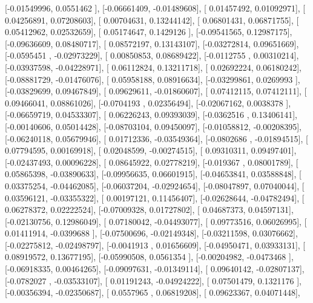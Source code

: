 \documentclass{article}
\begin{document}
       [-0.01549996,  0.0551462 ],
       [-0.06661409, -0.01489608],
       [ 0.01457492,  0.01092971],
       [ 0.04256891,  0.07208603],
       [ 0.00704631,  0.13244142],
       [ 0.06801431,  0.06871755],
       [ 0.05412962,  0.02532659],
       [ 0.05174647,  0.1429126 ],
       [-0.09541565,  0.12987175],
       [-0.09636609,  0.08480717],
       [ 0.08572197,  0.13143107],
       [-0.03272814,  0.09651669],
       [-0.0595451 , -0.02973229],
       [ 0.00850853,  0.08689422],
       [-0.0112755 ,  0.00310214],
       [-0.03937598, -0.04228971],
       [ 0.06112824,  0.13211718],
       [ 0.02692224,  0.06180242],
       [-0.08881729, -0.01476076],
       [ 0.05958188,  0.08916634],
       [-0.03299861,  0.0269993 ],
       [-0.03829699,  0.09467849],
       [ 0.09629611, -0.01860607],
       [ 0.07412115,  0.07412111],
       [ 0.09466041,  0.08861026],
       [-0.0704193 ,  0.02356494],
       [-0.02067162,  0.0038378 ],
       [-0.06659719,  0.04533307],
       [ 0.06226243,  0.09393039],
       [-0.0362516 ,  0.13406141],
       [-0.00140606,  0.05014428],
       [-0.08703104,  0.09450097],
       [-0.01058812, -0.00208395],
       [-0.06240118,  0.05679946],
       [ 0.01712336, -0.03549364],
       [-0.0802686 , -0.01894515],
       [ 0.07794595,  0.00169918],
       [ 0.02048599, -0.00274515],
       [ 0.09310311,  0.09497401],
       [-0.02437493,  0.00096228],
       [ 0.08645922,  0.02778219],
       [-0.019367  ,  0.08001789],
       [ 0.05865398, -0.03890633],
       [-0.09956635,  0.06601915],
       [-0.04653841,  0.03588848],
       [ 0.03375254, -0.04462085],
       [-0.06037204, -0.02924654],
       [-0.08047897,  0.07040044],
       [ 0.03596121, -0.03355322],
       [ 0.00197121,  0.11456407],
       [-0.02628644, -0.04782494],
       [ 0.06278372,  0.02222524],
       [-0.07009328,  0.01727802],
       [ 0.04687373,  0.04597131],
       [-0.02130756,  0.12986049],
       [ 0.07180042, -0.04493077],
       [ 0.09773516,  0.06026995],
       [ 0.01411914, -0.0399688 ],
       [-0.07500696, -0.02149348],
       [-0.03211598,  0.03076662],
       [-0.02275812, -0.02498797],
       [-0.0041913 ,  0.01656609],
       [-0.04950471,  0.03933131],
       [ 0.08919572,  0.13677195],
       [-0.05990508,  0.0561354 ],
       [-0.00204982, -0.0473468 ],
       [-0.06918335,  0.00464265],
       [-0.09097631, -0.01349114],
       [ 0.09640142, -0.02807137],
       [-0.0782027 , -0.03533107],
       [ 0.01191243, -0.04924222],
       [ 0.07501479,  0.1321176 ],
       [-0.00356394, -0.02350687],
       [ 0.0557965 ,  0.06819208],
       [ 0.09623367,  0.04071448],
\end{document}
